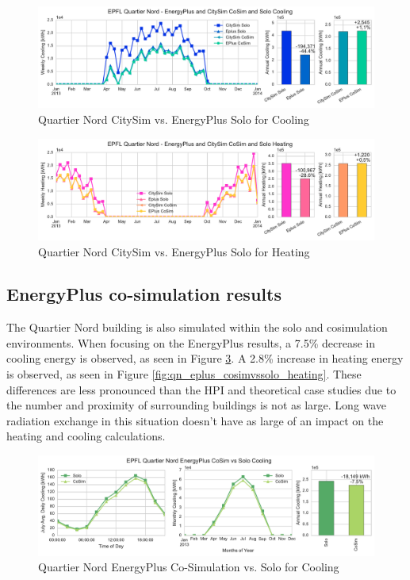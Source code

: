 \documentclass{tBPS2e}
\theoremstyle{plain}
\theoremstyle{definition}
\theoremstyle{remark}
\begin{document}
\begin{figure}[H]
\centering
\includegraphics[scale=0.55]{figures/QN_Cooling}
\caption{Quartier Nord CitySim vs. EnergyPlus Solo for Cooling}
\label{fig:qn_eplusvscitysim_cooling}
\end{figure}

\begin{figure}[H]
\centering
\includegraphics[scale=0.55]{figures/QN_Heating.pdf}
\caption{Quartier Nord CitySim vs. EnergyPlus Solo for Heating}
\label{fig:qn_eplusvscitysim_heating}
\end{figure}


\subsection{EnergyPlus co-simulation results}
The Quartier Nord building is also simulated within the solo and
cosimulation environments. When
focusing on the EnergyPlus results, a 7.5\% decrease in cooling energy is
observed, as seen in Figure
\ref{fig:qn_eplus_cosimvssolo_cooling}. A 2.8\% increase in heating energy is
observed, as seen in Figure
\ref{fig:qn_eplus_cosimvssolo_heating}. These differences are less pronounced
than the HPI and theoretical case studies due to the number and proximity of
surrounding buildings is not as large. Long wave radiation exchange in this situation 
doesn't have as large of an impact on the heating and cooling calculations.


\begin{figure}[H]
\centering
\includegraphics[scale=0.55]{figures/QN_EnergyPlus_Cooling}
\caption{Quartier Nord EnergyPlus Co-Simulation vs. Solo for Cooling}
\label{fig:qn_eplus_cosimvssolo_cooling}
\end{figure}
\end{document}
